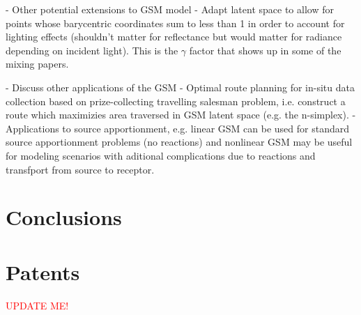 \documentclass[remotesensing,article,submit,pdftex,moreauthors]{Definitions/mdpi}
\begin{document}
- Other potential extensions to GSM model
     - Adapt latent space  to allow for points whose barycentric coordinates sum to less than 1 in order to account for lighting effects (shouldn't matter for reflectance but would matter for radiance depending on incident light). This is the $\gamma$ factor that shows up in some of the mixing papers.

- Discuss other applications of the GSM
    - Optimal route planning for in-situ data collection based on prize-collecting travelling salesman problem, i.e. construct a route which maximizies area traversed in GSM latent space (e.g. the n-simplex). 
    - Applications to source apportionment, e.g. linear GSM can be used for standard source apportionment problems (no reactions) and nonlinear GSM may be useful for modeling scenarios with aditional complications due to reactions and transfport from source to receptor.

\section{Conclusions}


\section{Patents}

\textcolor{red}{UPDATE ME!}

\vspace{6pt} 






\end{document}
